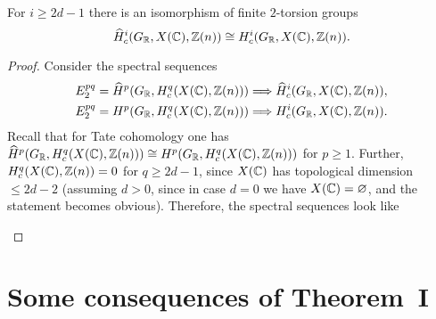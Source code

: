 \documentclass{article}
\numberwithin{equation}{section}
\begin{document}
\begin{lemma}
  \label{lemma:Tate-vs-normal-cohomology-of-X(C)}
  For $i \ge 2d - 1$ there is an isomorphism of finite $2$-torsion groups
  \[ \widehat{H}^i_c (G_{\mathbb{R}}, X (\mathbb{C}), \mathbb{Z}(n)) \cong
    H^i_c (G_{\mathbb{R}}, X (\mathbb{C}), \mathbb{Z}(n)). \]

  \begin{proof}
    Consider the spectral sequences
    \begin{align*}
      E^{pq}_2 = \widehat{H}^p (G_{\mathbb{R}}, H^q_c (X (\mathbb{C}), \mathbb{Z}(n))) & \Longrightarrow
      \widehat{H}^i_c (G_{\mathbb{R}}, X (\mathbb{C}), \mathbb{Z}(n)), \\
      E^{pq}_2 = H^p (G_{\mathbb{R}}, H^q_c (X (\mathbb{C}), \mathbb{Z}(n))) & \Longrightarrow
      H^i_c (G_{\mathbb{R}}, X (\mathbb{C}), \mathbb{Z}(n)).
    \end{align*}
    Recall that for Tate cohomology one has
    $\widehat{H}^p (G_{\mathbb{R}}, H^q_c (X (\mathbb{C}), \mathbb{Z}(n))) \cong
    H^p (G_{\mathbb{R}}, H^q_c (X (\mathbb{C}), \mathbb{Z}(n)))$ for $p \ge 1$.
    Further, $H^q_c (X (\mathbb{C}), \mathbb{Z}(n)) = 0$
    for $q \ge 2d-1$, since $X (\mathbb{C})$ has topological dimension $\le 2d - 2$
    (assuming $d > 0$, since in case $d = 0$ we have $X (\mathbb{C}) = \varnothing$, and
    the statement becomes obvious).  Therefore, the spectral sequences look like
    \begin{center}
    \end{center}
  \end{proof}
\end{lemma}


\section{Some consequences of Theorem~I}
\label{sec:consequences-of-theorem-I}
\end{document}
